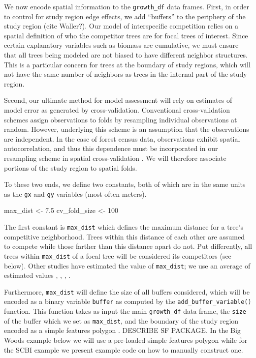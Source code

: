 \documentclass[12pt]{article}
\newenvironment{Shaded}{\begin{snugshade}}{\end{snugshade}}
\newcommand{\DecValTok}[1]{\textcolor[rgb]{0.00,0.00,0.81}{#1}}
\newcommand{\FloatTok}[1]{\textcolor[rgb]{0.00,0.00,0.81}{#1}}
\newcommand{\NormalTok}[1]{#1}
\newcommand{\StringTok}[1]{\textcolor[rgb]{0.31,0.60,0.02}{#1}}
\begin{document}
We now encode spatial information to the \texttt{growth\_df} data
frames. First, in order to control for study region edge effects, we add
``buffers'' to the periphery of the study region (cite Waller?). Our
model of interspecific competition relies on a spatial definition of who
the competitor trees are for focal trees of interest. Since certain
explanatory variables such as biomass are cumulative, we must ensure
that all trees being modeled are not biased to have different neighbor
structures. This is a particular concern for trees at the boundary of
study regions, which will not have the same number of neighbors as trees
in the internal part of the study region.

Second, our ultimate method for model assessment will rely on estimates
of model error as generated by cross-validation. Conventional
cross-validation schemes assign observations to folds by resampling
individual observations at random. However, underlying this scheme is an
assumption that the observations are independent. In the case of forest
census data, observations exhibit spatial autocorrelation, and thus this
dependence must be incorporated in our resampling scheme in spatial
cross-validation \citet{roberts2017} \citet{pohjankukka2017}. We will
therefore associate portions of the study region to spatial folds.

To these two ends, we define two constants, both of which are in the
same units as the \texttt{gx} and \texttt{gy} variables (most often
meters).

\begin{Shaded}
\begin{Highlighting}[]
\NormalTok{max_dist <-}\StringTok{ }\FloatTok{7.5}
\NormalTok{cv_fold_size <-}\StringTok{ }\DecValTok{100}
\end{Highlighting}
\end{Shaded}

The first constant is \texttt{max\_dist} which defines the maximum
distance for a tree's competitive neighborhood. Trees within this
distance of each other are assumed to compete while those farther than
this distance apart do not. Put differently, all trees within
\texttt{max\_dist} of a focal tree will be considered its competitors
(see below). Other studies have estimated the value of
\texttt{max\_dist}; we use an average of estimated values
\citet{canham_neighborhood_2004}, \citet{uriarte_spatially_2004},
\citet{tatsumi2013}, \citet{canham_neighborhood_2006}.

Furthermore, \texttt{max\_dist} will define the size of all buffers
considered, which will be encoded as a binary variable \texttt{buffer}
as computed by the \texttt{add\_buffer\_variable()} function. This
function takes as input the main \texttt{growth\_df} data frame, the
\texttt{size} of the buffer which we set as \texttt{max\_dist}, and the
boundary of the study region encoded as a simple features polygon
\citet{pebesma_simple_2018}. DESCRIBE SF PACKAGE. In the Big Woods
example below we will use a pre-loaded simple features polygon while for
the SCBI example we present example code on how to manually construct
one.
\end{document}
